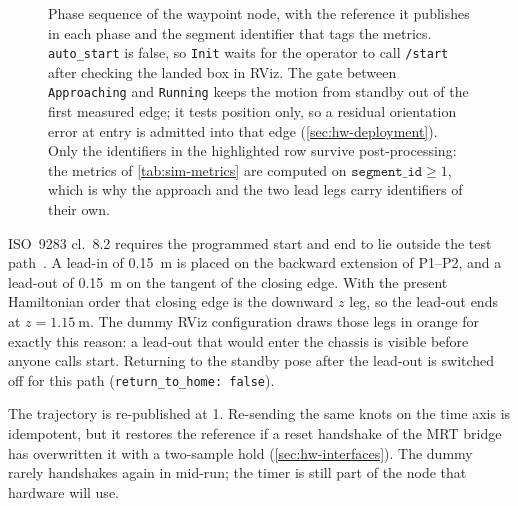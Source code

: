 \begin{figure}[htbp]
  \caption[Phase sequence of the waypoint node]{%
    Phase sequence of the waypoint node, with the reference it publishes
    in each phase and the segment identifier that tags the metrics.
    \texttt{auto\_start} is false, so \texttt{Init} waits for the operator
    to call \texttt{/start} after checking the landed box in RViz. The gate
    between \texttt{Approaching} and \texttt{Running} keeps the motion from
    standby out of the first measured edge; it tests position only, so a
    residual orientation error at entry is admitted into that edge
    (\cref{sec:hw-deployment}). Only the identifiers in the highlighted
    row survive post-processing: the metrics of \cref{tab:sim-metrics} are
    computed on $\texttt{segment\_id} \ge 1$, which is why the approach and
    the two lead legs carry identifiers of their own.}
  \label{fig:sim-phases}
\end{figure}

ISO~9283 cl.~8.2 requires the programmed start and end to lie outside
the test path~\cite{ISO9283}. A lead-in of \qty{0.15}{\meter} is placed
on the backward extension of P1--P2, and a lead-out of
\qty{0.15}{\meter} on the tangent of the closing edge. With the present
Hamiltonian order that closing edge is the downward $z$ leg, so the
lead-out ends at $z=\qty{1.15}{\meter}$. The dummy RViz configuration
draws those legs in orange for exactly this reason: a lead-out that
would enter the chassis is visible before anyone calls start. Returning
to the standby pose after the lead-out is switched off for this path
(\texttt{return\_to\_home: false}).

The trajectory is re-published at \qty{1}{\hz}. Re-sending the same
knots on the \ocs{} time axis is idempotent, but it restores the
reference if a reset handshake of the MRT bridge has overwritten it
with a two-sample hold (\cref{sec:hw-interfaces}). The dummy rarely
handshakes again in mid-run; the timer is still part of the node that
hardware will use.

